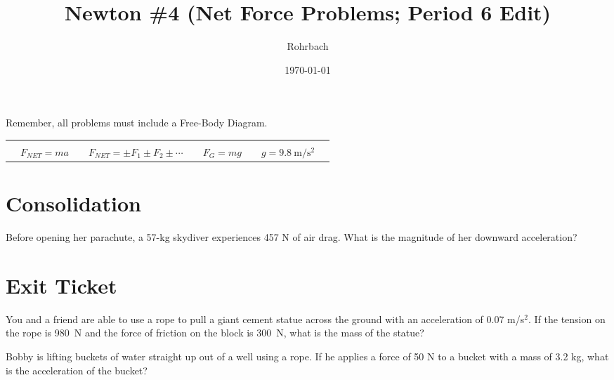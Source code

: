 \documentclass[10pt]{exam}
\title{Newton \#4 (Net Force Problems; Period 6 Edit)}
\author{Rohrbach}
\date{\today}
\newcommand{\printeqs}{
  \begin{center}
    \begin{tabular}{|*9c|}
      \hline 
      &&&&&&&&\\
      &
      $F_{NET}=ma$ &&
      $F_{NET}=\pm F_1 \pm F_2 \pm \cdots$ &&
      $F_G=mg$ &&
      $g=\SI{9.8}{\meter\per\second^2}$ &
      \\
      \hline
    \end{tabular}
  \end{center}
}
\begin{document}
\maketitle

\noindent
Remember, all problems must include a Free-Body Diagram.

\printeqs

\section*{Consolidation}

Before opening her parachute, a 57-kg skydiver experiences 457 N of air drag.  What is the magnitude of her downward acceleration?

\vs


\section*{Exit Ticket} 

\begin{questions}
  
    \question
      You and a friend are able to use a rope to pull a giant cement statue across the ground with an acceleration of 0.07 m/s$^2$.  If the tension on the rope is 980~N and the force of friction on the block is 300~N, what is the mass of the statue?
      \vs


    \question
      Bobby is lifting buckets of water straight up out of a well using a rope.  If he applies a force of 50 N to a bucket with a mass of 3.2 kg, what is the acceleration of the bucket?
      \vs

  

\end{questions}
\end{document}
